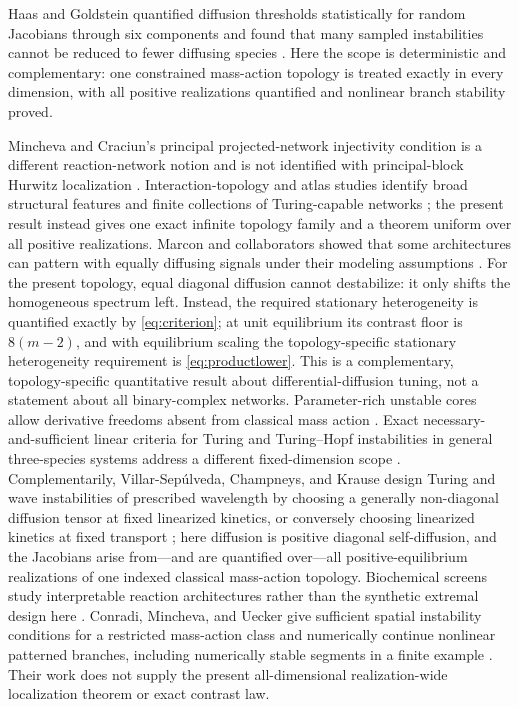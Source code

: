 \documentclass[11pt]{article}
\theoremstyle{definition}
\newcommand{\1}{\mathbf 1}
\begin{document}
Haas and Goldstein quantified diffusion thresholds statistically for random
Jacobians through six components and found that many sampled instabilities
cannot be reduced to fewer diffusing species \cite{HaasGoldstein2021}.  Here
the scope is deterministic and complementary: one constrained mass-action
topology is treated exactly in every dimension, with all positive
realizations quantified and nonlinear branch stability proved.

Mincheva and Craciun's principal projected-network injectivity condition is a
different reaction-network notion and is not identified with principal-block
Hurwitz localization \cite{MinchevaCraciun2013}.  Interaction-topology and
atlas studies identify broad structural features and finite collections of
Turing-capable networks \cite{Marcon2016,Diego2018,Scholes2019}; the present
result instead gives one exact infinite topology family and a theorem uniform
over all positive realizations.
Marcon and collaborators showed that some architectures can pattern with
equally diffusing signals under their modeling assumptions \cite{Marcon2016}.
For the present topology, equal diagonal diffusion cannot destabilize: it only
shifts the homogeneous spectrum left.  Instead, the required stationary
heterogeneity is quantified exactly by \eqref{eq:criterion}; at unit
equilibrium its contrast floor is $8(m-2)$, and with equilibrium scaling the
topology-specific stationary heterogeneity requirement is
\eqref{eq:productlower}.  This is a complementary,
topology-specific quantitative result about differential-diffusion tuning, not
a statement about all binary-complex networks.  Parameter-rich unstable cores
allow derivative
freedoms absent from classical mass action \cite{VassenaStadler2024}.
Exact necessary-and-sufficient linear criteria for Turing and Turing--Hopf
instabilities in general three-species systems address a different
fixed-dimension scope \cite{Piskovsky2025}.  Complementarily,
Villar-Sep\'ulveda, Champneys, and Krause design Turing and wave instabilities
of prescribed wavelength by choosing a generally non-diagonal diffusion
tensor at fixed linearized kinetics, or conversely choosing linearized
kinetics at fixed transport \cite{VillarChampneysKrause2025}; here diffusion
is positive diagonal self-diffusion, and the Jacobians arise from---and are
quantified over---all positive-equilibrium realizations of one indexed
classical mass-action topology.  Biochemical screens study interpretable reaction
architectures rather than the synthetic extremal design here
\cite{Paul2024}.  Conradi, Mincheva, and Uecker give sufficient spatial
instability conditions for a restricted mass-action class and numerically
continue nonlinear patterned branches, including numerically stable segments
in a finite example \cite{ConradiMinchevaUecker2026}.  Their work does not
supply the present all-dimensional realization-wide localization theorem or
exact contrast law.
\end{document}
